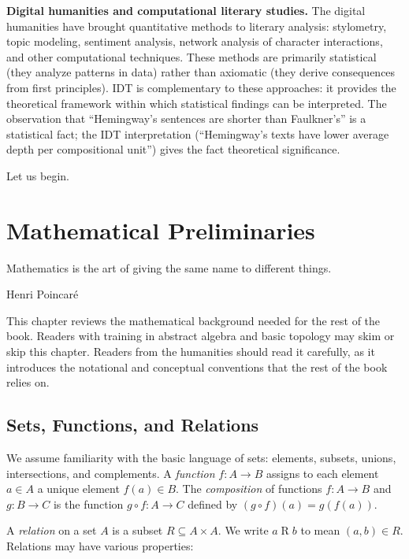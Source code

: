 \documentclass[11pt,openany]{book}
\theoremstyle{definition}
\theoremstyle{plain}
\theoremstyle{remark}
\begin{document}
\textbf{Digital humanities and computational literary studies.} The digital humanities have brought quantitative methods to literary analysis: stylometry, topic modeling, sentiment analysis, network analysis of character interactions, and other computational techniques. These methods are primarily statistical (they analyze patterns in data) rather than axiomatic (they derive consequences from first principles). IDT is complementary to these approaches: it provides the theoretical framework within which statistical findings can be interpreted. The observation that ``Hemingway's sentences are shorter than Faulkner's'' is a statistical fact; the IDT interpretation (``Hemingway's texts have lower average depth per compositional unit'') gives the fact theoretical significance.

\bigskip

Let us begin.


\chapter{Mathematical Preliminaries}
\label{ch:prelim}

\epigraph{Mathematics is the art of giving the same name to different things.}{Henri Poincar\'e}

This chapter reviews the mathematical background needed for the rest of the book. Readers with training in abstract algebra and basic topology may skim or skip this chapter. Readers from the humanities should read it carefully, as it introduces the notational and conceptual conventions that the rest of the book relies on.

\section{Sets, Functions, and Relations}

We assume familiarity with the basic language of sets: elements, subsets, unions, intersections, and complements. A \emph{function} $f : A \to B$ assigns to each element $a \in A$ a unique element $f(a) \in B$. The \emph{composition} of functions $f : A \to B$ and $g : B \to C$ is the function $g \circ f : A \to C$ defined by $(g \circ f)(a) = g(f(a))$.

A \emph{relation} on a set $A$ is a subset $R \subseteq A \times A$. We write $a \mathbin{R} b$ to mean $(a, b) \in R$. Relations may have various properties:
\end{document}
